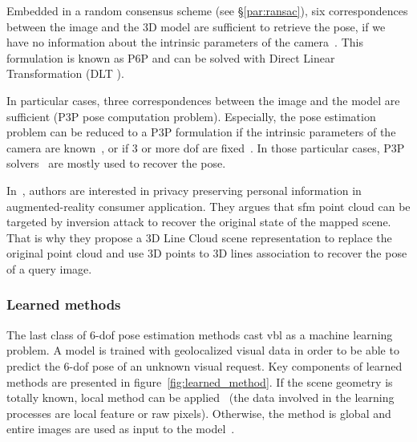 Embedded in a random consensus scheme (see \S\ref{par:ransac}), six correspondences between the image and the 3D model are sufficient to retrieve the pose, if we have no information about the intrinsic parameters of the camera~\citep{Donoser2014,Li2010,Li2010,Heisterklaus2014}. This formulation is known as P6P and can be solved with Direct Linear Transformation (DLT \citep{Hartley2003}).

In particular cases, three correspondences between the image and the model are sufficient (P3P pose computation problem). Especially, the pose estimation problem can be reduced to a P3P formulation if the intrinsic parameters of the camera are known~\citep{Irschara2009,Middelberg2014}, or if 3 or more \ac{dof} are fixed~\citep{Zeisl2015,Qu2016,Svarm2016,Svarm2014}. In those particular cases, P3P solvers~\citet{Kneip2014opengv} are mostly used to recover the pose.

In~\citep{Speciale2019}, authors are interested in privacy preserving personal information in augmented-reality consumer application. They argues that \ac{sfm} point cloud can be targeted by inversion attack to recover the original state of the mapped scene. That is why they propose a 3D Line Cloud scene representation to replace the original point cloud and use 3D points to 3D lines association to recover the pose of a query image.

\subsubsection{Learned methods}


\label{subsubsec:pose_regression}
The last class of 6-\ac{dof} pose estimation methods cast \ac{vbl} as a machine learning problem. A model is trained with geolocalized visual data in order to be able to predict the 6-\ac{dof} pose of an unknown visual request. Key components of learned methods are presented in figure~\ref{fig:learned_method}. If the scene geometry is totally known, local method can be applied~\citep{Shotton2013} (\ie the data involved in the learning processes are local feature or raw pixels). Otherwise, the method is global and entire images are used as input to the model~\citep{Kendall2015}.

